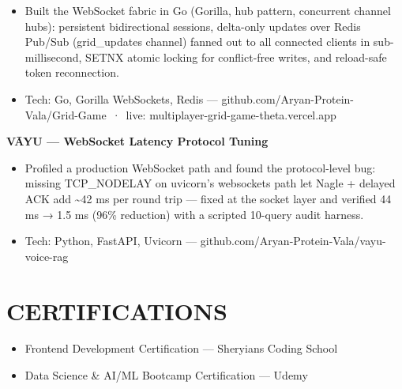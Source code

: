 \documentclass[9pt]{article}
\begin{document}
\vspace{1pt}
\begin{itemize}[leftmargin=11pt,itemsep=0pt,topsep=1pt,parsep=0pt]
\item Built the WebSocket fabric in Go (Gorilla, hub pattern, concurrent channel hubs): persistent bidirectional sessions, delta-only updates over Redis Pub/Sub (grid\_updates channel) fanned out to all connected clients in sub-millisecond, SETNX atomic locking for conflict-free writes, and reload-safe token reconnection.
\item Tech: Go, Gorilla WebSockets, Redis  ---  github.com/Aryan-Protein-Vala/Grid-Game \,·\, live: multiplayer-grid-game-theta.vercel.app
\end{itemize}
\textbf{VĀYU  ---  WebSocket Latency Protocol Tuning}
\vspace{1pt}
\begin{itemize}[leftmargin=11pt,itemsep=0pt,topsep=1pt,parsep=0pt]
\item Profiled a production WebSocket path and found the protocol-level bug: missing TCP\_NODELAY on uvicorn's websockets path let Nagle + delayed ACK add \textasciitilde{}42 ms per round trip  ---  fixed at the socket layer and verified 44 ms → 1.5 ms (96\% reduction) with a scripted 10-query audit harness.
\item Tech: Python, FastAPI, Uvicorn  ---  github.com/Aryan-Protein-Vala/vayu-voice-rag
\end{itemize}
\section*{CERTIFICATIONS}
\begin{itemize}[leftmargin=11pt,itemsep=0pt,topsep=1pt,parsep=0pt]
\item Frontend Development Certification  ---  Sheryians Coding School
\item Data Science \& AI/ML Bootcamp Certification  ---  Udemy
\end{itemize}
\end{document}
